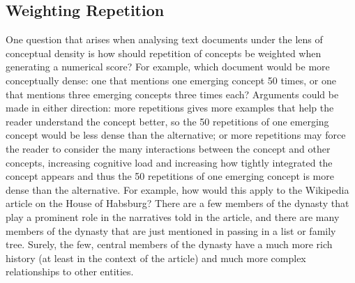 \documentclass[12pt]{article}
\theoremstyle{grammarstyle}
\begin{document}

\subsection{Weighting Repetition}
One question that arises when analysing text documents under the lens of conceptual density is how should repetition of concepts be weighted when generating a numerical score? For example, which document would be more conceptually dense: one that mentions one emerging concept 50 times, or one that mentions three emerging concepts three times each?
Arguments could be made in either direction: more repetitions gives more examples that help the reader understand the concept better, so the 50 repetitions of one emerging concept would be less dense than the alternative; or
more repetitions may force the reader to consider the many interactions between the concept and other concepts, increasing cognitive load and increasing how tightly integrated the concept appears and thus the 50 repetitions of one emerging concept is more dense than the alternative.
For example, how would this apply to the Wikipedia article on the House of Habsburg? There are a few members of the dynasty that play a prominent role in the narratives told in the article, and there are many members of the dynasty that are just mentioned in passing in a list or family tree. Surely, the few, central members of the dynasty have a much more rich history (at least in the context of the article) and much more complex relationships to other entities.
\end{document}
